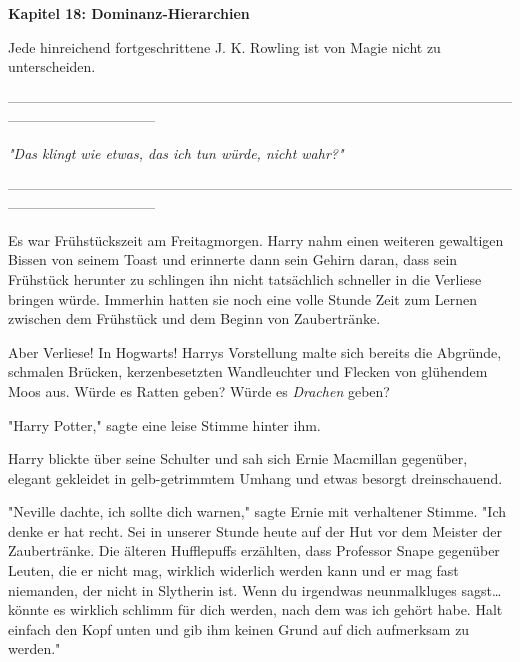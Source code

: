 

\hypertarget{dominanz-hierarchien}{%

\textbf{Kapitel 18: Dominanz-Hierarchien\\ }

Jede hinreichend fortgeschrittene J. K. Rowling ist von Magie nicht zu unterscheiden.

--------------------------------------------------------------------------------------------------------------------------------------------

\emph{"Das klingt wie etwas, das ich tun würde, nicht wahr?"}

--------------------------------------------------------------------------------------------------------------------------------------------

Es war Frühstückszeit am Freitagmorgen. Harry nahm einen weiteren gewaltigen Bissen von seinem Toast und erinnerte dann sein Gehirn daran, dass sein Frühstück herunter zu schlingen ihn nicht tatsächlich schneller in die Verliese bringen würde. Immerhin hatten sie noch eine volle Stunde Zeit zum Lernen zwischen dem Frühstück und dem Beginn von Zaubertränke.

Aber Verliese! In Hogwarts! Harrys Vorstellung malte sich bereits die Abgründe, schmalen Brücken, kerzenbesetzten Wandleuchter und Flecken von glühendem Moos aus. Würde es Ratten geben? Würde es \emph{Drachen} geben?

"Harry Potter," sagte eine leise Stimme hinter ihm.

Harry blickte über seine Schulter und sah sich Ernie Macmillan gegenüber, elegant gekleidet in gelb-getrimmtem Umhang und etwas besorgt dreinschauend.

"Neville dachte, ich sollte dich warnen," sagte Ernie mit verhaltener Stimme. "Ich denke er hat recht. Sei in unserer Stunde heute auf der Hut vor dem Meister der Zaubertränke. Die älteren Hufflepuffs erzählten, dass Professor Snape gegenüber Leuten, die er nicht mag, wirklich widerlich werden kann und er mag fast niemanden, der nicht in Slytherin ist. Wenn du irgendwas neunmalkluges sagst… könnte es wirklich schlimm für dich werden, nach dem was ich gehört habe. Halt einfach den Kopf unten und gib ihm keinen Grund auf dich aufmerksam zu werden."

}
